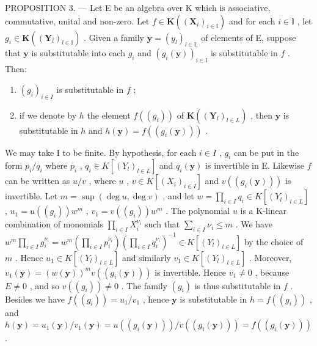 PROPOSITION 3. --- Let E be an algebra over K which is associative, commutative, unital and non-zero. Let \(f \in \mathbf{K}((\mathbf{X}_i)_{i \in \mathbb{I}})\) and for each \(i \in \mathbb{I}\) , let \(g_i \in \mathbf{K}((\mathbf{Y}_l)_{l \in \mathbb{I}})\) . Given a family \(\mathbf{y} = (y_l)_{l \in \mathbb{L}}\) of elements of E, suppose that \(\mathbf{y}\) is substitutable into each \(g_i\) and \((g_i(\mathbf{y}))_{i \in \mathbb{I}}\) is substitutable in \(f\) . Then:

\begin{enumerate}
\def\labelenumi{(\roman{enumi})}
\item
  \((g_{i})_{i\in I}\) is substitutable in \(f\) ;
\item
  if we denote by \(h\) the element \(f((g_i))\) of \(\mathbf{K}((\mathbf{Y}_l)_{l \in L})\) , then \(\mathbf{y}\) is substitutable in \(h\) and \(h(\mathbf{y}) = f((g_i(\mathbf{y})))\) .
\end{enumerate}

We may take I to be finite. By hypothesis, for each \(i \in I\) , \(g_i\) can be put in the form \(p_i/q_i\) where \(p_i\) , \(q_i \in K[(Y_l)_{l \in L}]\) and \(q_i(\mathbf{y})\) is invertible in E. Likewise \(f\) can be written as \(u/v\) , where \(u\) , \(v \in K[(X_i)_{i \in I}]\) and \(v((g_i(\mathbf{y})))\) is invertible. Let \(m = \sup(\deg u, \deg v)\) , and let \(w = \prod_{i \in I} q_i \in K[(Y_l)_{l \in L}]\) , \(u_1 = u((g_i))w^m\) , \(v_1 = v((g_i))w^m\) . The polynomial \(u\) is a K-linear combination of monomials \(\prod_{i \in I} X_i^{\nu_i}\) such that \(\sum_{i \in I} \nu_i \leqslant m\) . We have \(w^m \prod_{i \in I} g_i^{\nu_i} = w^m\left(\prod_{i \in I} p_i^{\nu_i}\right)\left(\prod_{i \in I} q_i^{\nu_i}\right)^{-1} \in K[(Y_l)_{l \in L}]\) by the choice of \(m\) . Hence \(u_1 \in K[(Y_l)_{l \in L}]\) and similarly \(v_1 \in K[(Y_l)_{l \in L}]\) . Moreover, \(v_1(\mathbf{y}) = (w(\mathbf{y}))^m v((g_i(\mathbf{y})))\) is invertible. Hence \(v_1 \neq 0\) , because \(E \neq 0\) , and so \(v((g_i)) \neq 0\) . The family \((g_i)\) is thus substitutable in \(f\) . Besides we have \(f((g_i)) = u_1/v_1\) , hence \(\mathbf{y}\) is substitutable in \(h = f((g_i))\) , and \(h(\mathbf{y}) = u_1(\mathbf{y})/v_1(\mathbf{y}) = u((g_i(\mathbf{y})))/v((g_i(\mathbf{y}))) = f((g_i(\mathbf{y})))\) .

